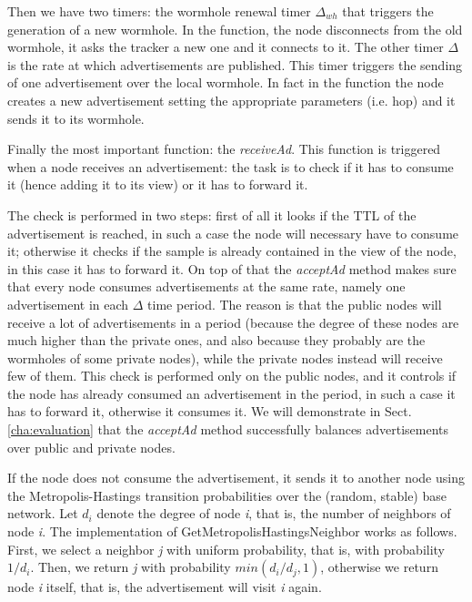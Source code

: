 Then we have two timers: the wormhole renewal timer $\Delta_{wh}$ that triggers the generation of a new wormhole. In the function, the node disconnects from the old wormhole, it asks the tracker a new one and it connects to it. The other timer $\Delta$ is the rate at which advertisements are published. This timer triggers the sending of one advertisement over the local wormhole. In fact in the function the node creates a new advertisement setting the appropriate parameters (i.e. hop) and it sends it to its wormhole.

Finally the most important function: the \textit{receiveAd}. This function is triggered when a node receives an advertisement: the task is to check if it has to consume it (hence adding it to its view) or it has to forward it. 

The check is performed in two steps: first of all it looks if the TTL of the advertisement is reached, in such a case the node will necessary have to consume it; otherwise it checks if the sample is already contained in the view of the node, in this case it has to forward it. On top of that the \textit{acceptAd} method makes sure that every node consumes advertisements at the same rate, namely one advertisement in each $\Delta$ time period. The reason is that the public nodes will receive a lot of advertisements in a period (because the degree of these nodes are much higher than the private ones, and also because they probably are the wormholes of some private nodes), while the private nodes instead will receive few of them. This check is performed only on the public nodes, and it controls if the node has already consumed an advertisement in the period, in such a case it has to forward it, otherwise it consumes it. We will demonstrate in Sect. \ref{cha:evaluation} that the \textit{acceptAd} method successfully balances advertisements over public and private nodes.

If the node does not consume the advertisement, it sends it to another node using the Metropolis-Hastings transition probabilities over the (random, stable) base network\cite{metropolis}.  Let $d_i$ denote the degree of node \textit{i}, that is, the number of neighbors of node \textit{i}. The implementation of GetMetropolisHastingsNeighbor works as follows. First, we select a neighbor \textit{j} with uniform probability, that is, with probability $1/d_i$. Then, we return \textit{j} with probability $min(d_i /d_j , 1)$, otherwise we return node \textit{i} itself, that is, the advertisement will visit \textit{i} again\cite{wormhole}.

